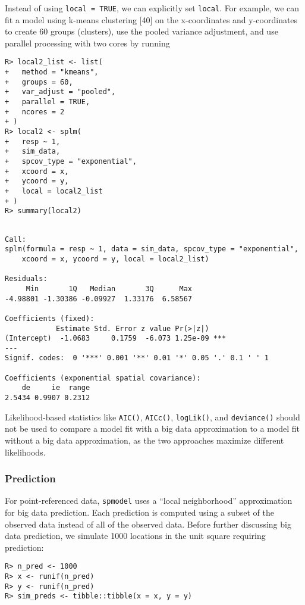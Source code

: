 \documentclass[10pt,letterpaper]{article}
\begin{document}
Instead of using \texttt{local\ =\ TRUE}, we can explicitly set
\texttt{local}. For example, we can fit a model using k-means clustering
{[}40{]} on the x-coordinates and y-coordinates to create 60 groups
(clusters), use the pooled variance adjustment, and use parallel
processing with two cores by running

\begin{verbatim}
R> local2_list <- list(
+   method = "kmeans",
+   groups = 60,
+   var_adjust = "pooled",
+   parallel = TRUE,
+   ncores = 2
+ )
R> local2 <- splm(
+   resp ~ 1,
+   sim_data,
+   spcov_type = "exponential",
+   xcoord = x,
+   ycoord = y,
+   local = local2_list
+ )
R> summary(local2)
\end{verbatim}

\begin{verbatim}

Call:
splm(formula = resp ~ 1, data = sim_data, spcov_type = "exponential", 
    xcoord = x, ycoord = y, local = local2_list)

Residuals:
     Min       1Q   Median       3Q      Max 
-4.98801 -1.30386 -0.09927  1.33176  6.58567 

Coefficients (fixed):
            Estimate Std. Error z value Pr(>|z|)    
(Intercept)  -1.0683     0.1759  -6.073 1.25e-09 ***
---
Signif. codes:  0 '***' 0.001 '**' 0.01 '*' 0.05 '.' 0.1 ' ' 1

Coefficients (exponential spatial covariance):
    de     ie  range 
2.5434 0.9907 0.2312 
\end{verbatim}

Likelihood-based statistics like \texttt{AIC()}, \texttt{AICc()},
\texttt{logLik()}, and \texttt{deviance()} should not be used to compare
a model fit with a big data approximation to a model fit without a big
data approximation, as the two approaches maximize different
likelihoods.

\hypertarget{sec:predict}{%
\subsubsection{Prediction}\label{sec:predict}}

For point-referenced data, \texttt{spmodel} uses a ``local
neighborhood'' approximation for big data prediction. Each prediction is
computed using a subset of the observed data instead of all of the
observed data. Before further discussing big data prediction, we
simulate 1000 locations in the unit square requiring prediction:

\begin{verbatim}
R> n_pred <- 1000
R> x <- runif(n_pred)
R> y <- runif(n_pred)
R> sim_preds <- tibble::tibble(x = x, y = y)
\end{verbatim}
\end{document}
